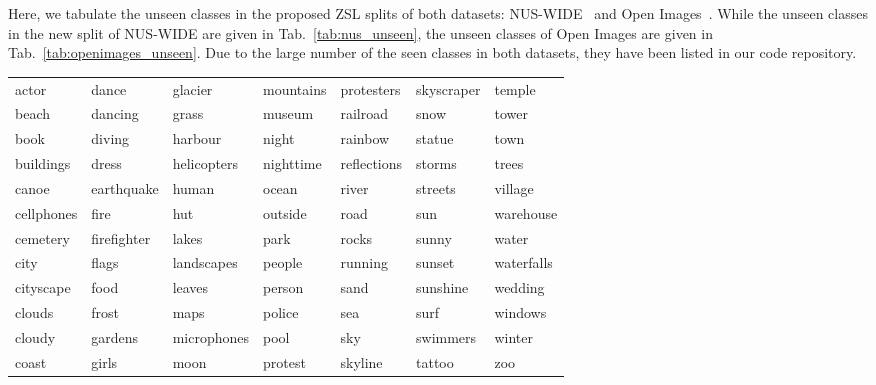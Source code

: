 \documentclass[10pt,journal,compsoc]{IEEEtran}
\begin{document}
Here, we tabulate the unseen classes in the proposed ZSL splits of both datasets: NUS-WIDE~\cite{nuswide} and Open Images~\cite{openimages}. While the  unseen classes in the new split of NUS-WIDE are given in Tab.~\ref{tab:nus_unseen}, the  unseen classes of Open Images are given in Tab.~\ref{tab:openimages_unseen}.
Due to the large number of the seen classes in both datasets, they have been listed in our code repository.


\begin{table*}[t]
\caption{84 unseen classes in the proposed split of the NUS-WIDE dataset\vspace{-0.1cm}}
\label{tab:nus_unseen}
\centering
\begin{tabular}{@{}lllllll@{}}
\toprule
actor      & dance       & glacier     & mountains & protesters  & skyscraper & temple     \\
beach      & dancing     & grass       & museum    & railroad    & snow       & tower      \\
book       & diving      & harbour     & night     & rainbow     & statue     & town       \\
buildings  & dress       & helicopters & nighttime & reflections & storms     & trees      \\
canoe      & earthquake  & human       & ocean     & river       & streets    & village    \\
cellphones & fire        & hut         & outside   & road        & sun        & warehouse  \\
cemetery   & firefighter & lakes       & park      & rocks       & sunny      & water      \\
city       & flags       & landscapes  & people    & running     & sunset     & waterfalls \\
cityscape  & food        & leaves      & person    & sand        & sunshine   & wedding    \\
clouds     & frost       & maps        & police    & sea         & surf       & windows    \\
cloudy     & gardens     & microphones & pool      & sky         & swimmers   & winter     \\
coast      & girls       & moon        & protest   & skyline     & tattoo     & zoo        \\ \bottomrule
\end{tabular}
\end{table*}
\end{document}
